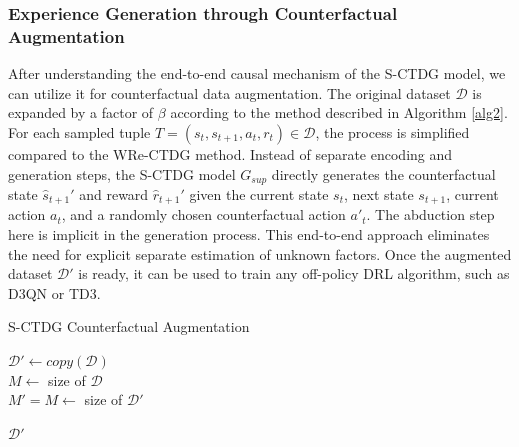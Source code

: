 \subsubsection{Experience Generation through Counterfactual Augmentation}

After understanding the end-to-end causal mechanism of the S-CTDG model,
we can utilize it for counterfactual data augmentation.
The original dataset $\mathcal{D}$ is expanded by a factor of $\beta$
according to the method described in Algorithm \ref{alg2}.
For each sampled tuple
$T = (s_t, s_{t+1}, a_t, r_t) \in \mathcal{D}$,
the process is simplified compared to the WRe-CTDG method.
Instead of separate encoding and generation steps,
the S-CTDG model $G_{sup}$ directly generates the counterfactual
state $\hat{s}_{t+1}'$ and reward $\hat{r}_{t+1}'$
given the current state $s_t$, next state $s_{t+1}$,
current action $a_t$, and a randomly chosen counterfactual action $a'_t$.
The abduction step here is implicit in the generation process.
This end-to-end approach eliminates the need for explicit
separate estimation of unknown factors.
Once the augmented dataset $\mathcal{D}'$ is ready, it can be used to
train any off-policy DRL algorithm, such as D3QN or TD3.

\begin{algorithm}[hb]
    \small
    \caption{S-CTDG Counterfactual Augmentation} \label{alg2}
    
    \vspace{1pt}
    
    
    \BlankLine
    $\mathcal{D'} \gets copy(\mathcal{D})$ \\
    $M \gets$ size of $\mathcal{D}$ \\
    $M' = M \gets$ size of $\mathcal{D'}$ \\
    
    \BlankLine
    \Return $\mathcal{D}'$
    \vspace{2pt}
\end{algorithm}
